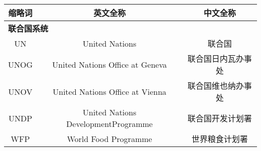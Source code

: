 \thispagestyle{fancy}
{}
\begin{center}
	\noindent 
	\bfseries 
\end{center}
\rmfamily
\vspace{\baselineskip}
\begin{table}[h!]
	\begin{spacing}{1.5}
		\begin{center}  
			\begin{tabular}{|c|c|c|}
				\hline
				缩略词 & 英文全称 & 中文全称 \\
				\hline
				\multicolumn{3}{|l|}{\textbf{联合国系统}} \\
				\hline
				UN & United Nations & 联合国 \\
				\hline
				UNOG & United Nations Office at Geneva & 联合国日内瓦办事处 \\
				\hline
				UNOV & United Nations Office at Vienna & 联合国维也纳办事处 \\
				\hline
				UNDP & United Nations DevelopmentProgramme & 联合国开发计划署 \\
				\hline
				WFP & World Food Programme & 世界粮食计划署 \\
				\hline
			\end{tabular}
			
		\end{center}
	\end{spacing}
\end{table}
\vspace{10pt}
	

